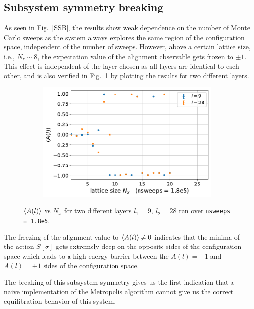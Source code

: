 \documentclass[../thesis_main.tex]{subfiles}
\begin{document}
\subsection{Subsystem symmetry breaking}
As seen in Fig.~\ref{SSB}, the results show weak dependence on the number of Monte Carlo sweeps as the system always explores the same region of the configuration space, independent of the number of sweeps. However, above a certain lattice size, i.e., $N_\tau \sim 8$, the expectation value of the alignment observable gets frozen to $\pm 1$. This effect is independent of the layer chosen as all layers are identical to each other, and is also verified in Fig.~\ref{differentlayer_sameMCsweeps} by plotting the results for two different layers.
\begin{figure}[!htb]
    \centering
    \begin{subfigure}[b]{0.5\textwidth}
        \centering
        \includegraphics[width=\textwidth]{images/expval(A_l)_vs_N_x/A vs N_x (nsweeps=1.8e5).pdf}
    \end{subfigure}
    \caption{$\expval{A(l)}$ vs $N_x$ for two different layers $l_1 = 9,\: l_2 = 28$ ran over \texttt{nsweeps = 1.8e5}.}
    \label{differentlayer_sameMCsweeps}
\end{figure}
\FloatBarrier
The freezing of the alignment value to $\expval{A(l)} \neq 0$ indicates that the minima of the action $S[\sigma]$ gets extremely deep on the opposite sides of the configuration space which leads to a high energy barrier between the $A(l)= - 1$ and $A(l) = +1$ sides of the configuration space.

The breaking of this subsystem symmetry gives us the first indication that a naive implementation of the Metropolis algorithm cannot give us the correct equilibration behavior of this system.
\end{document}
